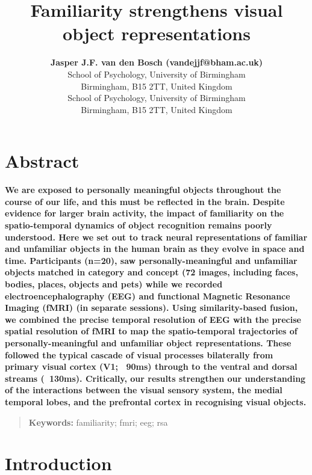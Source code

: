 \documentclass[10pt,letterpaper]{article}
\title{Familiarity strengthens visual object representations}
\author{{\large \bf Jasper J.F. van den Bosch (vandejjf@bham.ac.uk)} \\
  School of Psychology, University of Birmingham\\
  Birmingham, B15 2TT, United Kingdom
  \AND {\large \bf Ian Charest (charesti@bham.ac.uk)} \\
  School of Psychology, University of Birmingham\\
  Birmingham, B15 2TT, United Kingdom}
\begin{document}
\maketitle


\section{Abstract}
{
\bf
We are exposed to personally meaningful objects throughout the 
course of our life, and this must  be reflected in the brain. 
Despite evidence for larger brain activity, the impact of 
familiarity on the spatio-temporal dynamics of object recognition 
remains poorly understood. Here we set out to track neural 
representations of familiar and unfamiliar objects in the human 
brain as they evolve in space and time. Participants (n=20), 
saw personally-meaningful and unfamiliar objects matched in 
category and concept (72 images, including faces, bodies, 
places, objects and pets) while we recorded electroencephalography 
(EEG) and functional Magnetic Resonance Imaging (fMRI) (in separate 
sessions). Using similarity-based fusion, we combined the precise 
temporal resolution of EEG with the precise spatial resolution of 
fMRI to map the spatio-temporal trajectories of personally-meaningful 
and unfamiliar object representations. These followed the typical 
cascade of visual processes bilaterally from primary visual cortex 
(V1; ~90ms) through to the ventral and dorsal streams (~130ms). 
Critically, our results strengthen our understanding of the interactions 
between the visual sensory system, the medial temporal lobes, and 
the prefrontal cortex in recognising visual objects. 
}
\begin{quote}
\small
\textbf{Keywords:} 
familiarity; fmri; eeg; rsa
\end{quote}

\section{Introduction}
\end{document}
